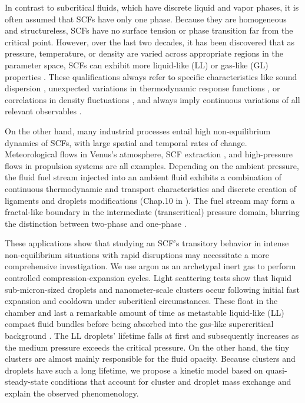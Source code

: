 In contrast to subcritical fluids, which have discrete liquid and vapor phases, it is often assumed that SCFs have only one phase. Because they are homogeneous and structureless, SCFs have no surface tension or phase transition far from the critical point. However, over the last two decades, it has been discovered that as pressure, temperature, or density are varied across appropriate regions in the parameter space, SCFs can exhibit more liquid-like (LL) or gas-like (GL) properties \cite{simeoni2010widom, gorelli2006liquidlike, banuti2015crossing, maxim2019visualization, pipich2018densification, pipich2020polymorphic, prescher2017experimental, proctor2018liquid, bryk2017behavior}. These qualifications always refer to specific characteristics like sound dispersion \cite{simeoni2010widom, gorelli2006liquidlike}, unexpected variations in thermodynamic response functions \cite{banuti2015crossing}, or correlations in density fluctuations \cite{ploetz2019gas}, and always imply continuous variations of all relevant observables \cite{schienbein2018investigation}.

On the other hand, many industrial processes entail high non-equilibrium dynamics of SCFs, with large spatial and temporal rates of change. Meteorological flows in Venus's atmosphere, SCF extraction \cite{taylor1996supercritical}, and high-pressure flows in propulsion systems are all examples. Depending on the ambient pressure, the fluid fuel stream injected into an ambient fluid exhibits a combination of continuous thermodynamic and transport characteristics and discrete creation of ligaments and droplets modifications (Chap.10 in \cite{bellan2020high}). The fuel stream may form a fractal-like boundary in the intermediate (transcritical) pressure domain, blurring the distinction between two-phase and one-phase \cite{harstad2000all}.

These applications show that studying an SCF's transitory behavior in intense non-equilibrium situations with rapid disruptions may necessitate a more comprehensive investigation. We use argon as an archetypal inert gas to perform controlled compression-expansion cycles. Light scattering tests show that liquid sub-micron-sized droplets and nanometer-scale clusters occur following initial fast expansion and cooldown under subcritical circumstances. These float in the chamber and last a remarkable amount of time as metastable liquid-like (LL) compact fluid bundles before being absorbed into the gas-like supercritical background \cite{harstad2000all}. The LL droplets' lifetime falls at first and subsequently increases as the medium pressure exceeds the critical pressure. On the other hand, the tiny clusters are almost mainly responsible for the fluid opacity. Because clusters and droplets have such a long lifetime, we propose a kinetic model based on quasi-steady-state conditions that account for cluster and droplet mass exchange and explain the observed phenomenology.



